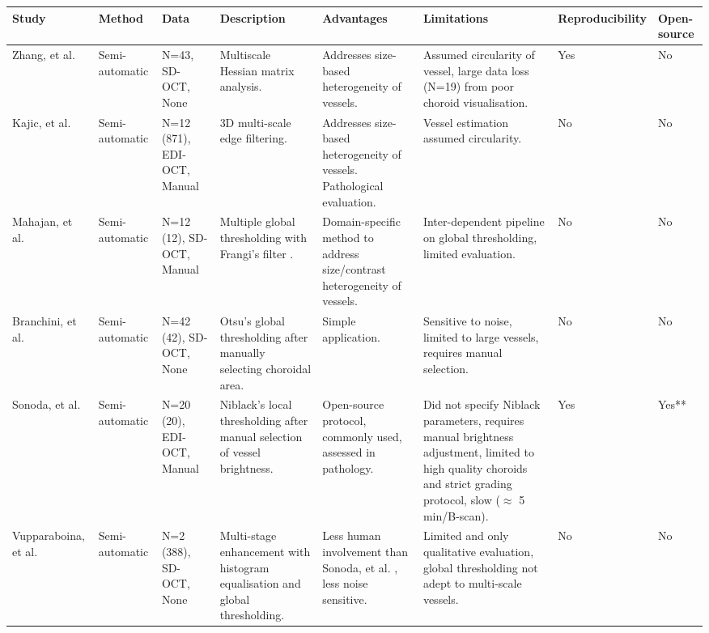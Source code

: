 \notsotiny

{\begin{longtable}{p{1.5cm}p{1.5cm}p{1.75cm}p{4cm}p{4cm}p{4cm}P{0.75cm}p{0.75cm}}
\toprule
Study & Method & Data & Description & Advantages & Limitations & Reproducibility & Open-source \\ \hline
\endfirsthead
\endhead
\midrule
\endfoot
\endlastfoot
Zhang, et al. \cite{zhang2012automated} & Semi-automatic & N=43, SD-OCT, None & Multiscale Hessian matrix analysis. & Addresses size-based heterogeneity of vessels. & Assumed circularity of vessel, large data loss (N=19) from poor choroid visualisation. & Yes & No \\

Kajic, et al. \cite{kajic2012automated_3d, esmaeelpour2014choroidal} & Semi-automatic & N=12 (871), EDI-OCT, Manual & 3D multi-scale edge filtering. & Addresses size-based heterogeneity of vessels. Pathological evaluation. & Vessel estimation assumed circularity. & No & No \\

Mahajan, et al. \cite{mahajan2013automated} & Semi-automatic & N=12 (12), SD-OCT, Manual & Multiple global thresholding with Frangi's filter \cite{frangi1998multiscale}. & Domain-specific method to address size/contrast heterogeneity of vessels. & Inter-dependent pipeline on global thresholding, limited evaluation. & No & No \\

Branchini, et al. \cite{branchini2013analysis} & Semi-automatic & N=42 (42), SD-OCT, None & Otsu's global thresholding after manually selecting choroidal area. & Simple application. & Sensitive to noise, limited to large vessels, requires manual selection. & No & No \\

Sonoda, et al. \cite{sonoda2014choroidal} & Semi-automatic & N=20 (20), EDI-OCT, Manual & Niblack’s local thresholding after manual selection of vessel brightness. & Open-source protocol, commonly used, assessed in pathology. & Did not specify Niblack parameters, requires manual brightness adjustment, limited to high quality choroids and strict grading protocol, slow ($\approx$ 5 min/B-scan). & Yes & Yes** \\

Vupparaboina, et al. \cite{vupparaboina2016optical} & Semi-automatic & N=2 (388), SD-OCT, None & Multi-stage enhancement with histogram equalisation and global thresholding. & Less human involvement than Sonoda, et al. \cite{sonoda2014choroidal}, less noise sensitive. & Limited and only qualitative evaluation, global thresholding not adept to multi-scale vessels. & No & No \\


\end{longtable}}
